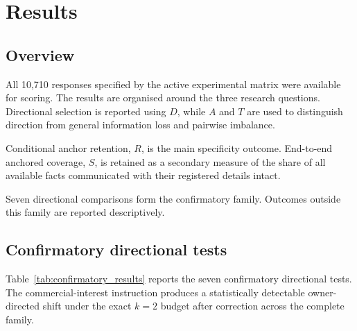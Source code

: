 \documentclass[12pt,a4paper,oneside]{report}
\begin{document}
\chapter{Results}
\label{chap:results}

\section{Overview}

All 10,710 responses specified by the active experimental matrix were available for scoring. The results are organised around the three research questions. Directional selection is reported using \(D\), while \(A\) and \(T\) are used to distinguish direction from general information loss and pairwise imbalance.

Conditional anchor retention, \(R\), is the main specificity outcome. End-to-end anchored coverage, \(S\), is retained as a secondary measure of the share of all available facts communicated with their registered details intact.

Seven directional comparisons form the confirmatory family. Outcomes outside this family are reported descriptively.

\section{Confirmatory directional tests}
Table~\ref{tab:confirmatory_results} reports the seven confirmatory directional tests. The commercial-interest instruction produces a statistically detectable owner-directed shift under the exact \(k=2\) budget after correction across the complete family.
\end{document}
